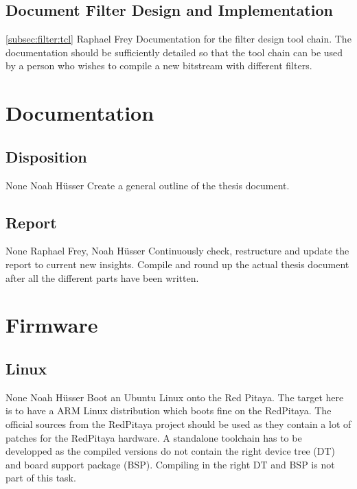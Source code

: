 \documentclass[a4paper,oneside]{alpenspecs/alpenspecs}
\begin{document}
\subsection{Document Filter Design and Implementation}
\label{subsec:filter:doc}

\wpac
    {}
    {}
    {}
    {\ref{subsec:filter:tcl}}
    {}
    {Raphael Frey}
    {%
        Documentation  for the  filter design  tool chain. The  documentation
        should be sufficiently detailed so that the tool chain can be used by
        a  person  who wishes  to  compile  a  new bitstream  with  different
        filters.
    }


\section{Documentation}
\label{sec:docs}

\subsection{Disposition}
\wpac
    {}
    {}
    {}
    {None}
    {}
    {Noah H\"usser}
    {%
    Create a general outline of the thesis document.%
    }

\subsection{Report}
\wpac
    {}
    {}
    {}
    {None}
    {}
    {Raphael Frey, Noah H\"usser}
    {%
    Continuously check, restructure and update the report to current new insights.
    Compile and round up the actual thesis document after all the different parts have been written.%
    }


\section{Firmware}
\label{sec:firmware}

\subsection{Linux}
\label{subsec:fw:linux}

\wpac
    {}
    {}
    {}
    {None}
    {}
    {Noah H\"usser}
    {%
    Boot an Ubuntu Linux onto the Red Pitaya.%
    The target here is to have a ARM Linux distribution which boots fine on the RedPitaya.
    The official sources from the RedPitaya project should be used as they contain a lot of patches for the RedPitaya hardware.
    A standalone toolchain has to be developped as the compiled versions do not contain the right device tree (DT) and board support package (BSP).
    Compiling in the right DT and BSP is not part of this task.
    }
\end{document}
